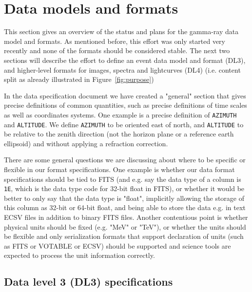 \section{Data models and formats}

This section gives an overview of the status and plans for the gamma-ray data model and formats. As mentioned before, this effort was only started very recently and none of the formats should be considered stable. The next two sections will describe the effort to define an event data model and format (DL3), and higher-level formats for images, spectra and lightcurves (DL4) (i.e. content split as already illustrated in Figure~\ref{fig:purpose})

In the data specification document we have created a "general" section that gives precise definitions of common quantities, such as precise definitions of time scales as well as coordinates systems. One example is a precise definition of \texttt{AZIMUTH} and \texttt{ALTITUDE}. We define \texttt{AZIMUTH} to be oriented east of north, and \texttt{ALTITUDE} to be relative to the zenith direction (not the horizon plane or a reference earth ellipsoid) and without applying a refraction correction.

There are some general questions we are discussing about where to be specific or flexible in our format specifications. One example is whether our data format specifications should be tied to FITS (and e.g. say the data type of a column is \texttt{1E}, which is the data type code for 32-bit float in FITS), or whether it would be better to only say that the data type is "float", implicitly allowing the storage of this column as 32-bit or 64-bit float, and being able to store the data e.g. in text ECSV files in addition to binary FITS files. Another contentious point is whether physical units should be fixed (e.g. "MeV" or "TeV"), or whether the units should be flexible and only serialization formats that support declaration of units (such as FITS or VOTABLE or ECSV) should be supported and science tools are expected to process the unit information correctly.

\subsection{Data level 3 (DL3) specifications}


